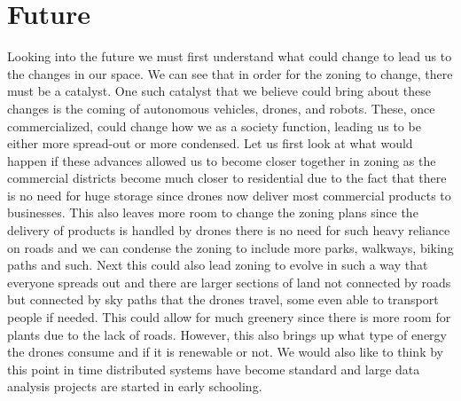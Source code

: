 \documentclass[titlepage]{article}
\begin{document}
\section{Future}
Looking into the future we must first understand what could change to lead us to the changes in our space. We can see that in order for the zoning to change, there must be a catalyst. One such catalyst that we believe could bring about these changes is the coming of autonomous vehicles, drones, and robots. These, once commercialized, could change how we as a society function, leading us to be either more spread-out or more condensed. Let us first look at what would happen if these advances allowed us to become closer together in zoning as the commercial districts become much closer to residential due to the fact that there is no need for huge storage since drones now deliver most commercial products to businesses. This also leaves more room to change the zoning plans since the delivery of products is handled by drones there is no need for such heavy reliance on roads and we can condense the zoning to include more parks, walkways, biking paths and such. Next this could also lead zoning to evolve in such a way that everyone spreads out and there are larger sections of land not connected by roads but connected by sky paths that the drones travel, some even able to transport people if needed. This could allow for much greenery since there is more room for plants due to the lack of roads. However, this also brings up what type of energy the drones consume and if it is renewable or not. We would also like to think by this point in time distributed systems have become standard and large data analysis projects are started in early schooling.
\end{document}
